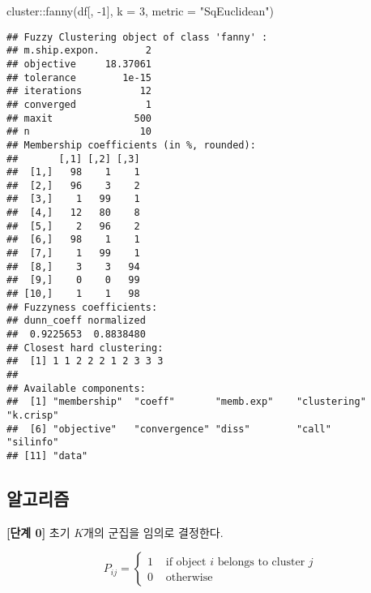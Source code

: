 \documentclass[
]{book}
\newenvironment{Shaded}{\begin{snugshade}}{\end{snugshade}}
\newcommand{\AttributeTok}[1]{\textcolor[rgb]{0.77,0.63,0.00}{#1}}
\newcommand{\DecValTok}[1]{\textcolor[rgb]{0.00,0.00,0.81}{#1}}
\newcommand{\FunctionTok}[1]{\textcolor[rgb]{0.00,0.00,0.00}{#1}}
\newcommand{\NormalTok}[1]{#1}
\newcommand{\SpecialCharTok}[1]{\textcolor[rgb]{0.00,0.00,0.00}{#1}}
\newcommand{\StringTok}[1]{\textcolor[rgb]{0.31,0.60,0.02}{#1}}
\begin{document}
\begin{Shaded}
\begin{Highlighting}[]
\NormalTok{cluster}\SpecialCharTok{::}\FunctionTok{fanny}\NormalTok{(df[, }\SpecialCharTok{{-}}\DecValTok{1}\NormalTok{], }\AttributeTok{k =} \DecValTok{3}\NormalTok{, }\AttributeTok{metric =} \StringTok{"SqEuclidean"}\NormalTok{)}
\end{Highlighting}
\end{Shaded}

\begin{verbatim}
## Fuzzy Clustering object of class 'fanny' :                      
## m.ship.expon.        2
## objective     18.37061
## tolerance        1e-15
## iterations          12
## converged            1
## maxit              500
## n                   10
## Membership coefficients (in %, rounded):
##       [,1] [,2] [,3]
##  [1,]   98    1    1
##  [2,]   96    3    2
##  [3,]    1   99    1
##  [4,]   12   80    8
##  [5,]    2   96    2
##  [6,]   98    1    1
##  [7,]    1   99    1
##  [8,]    3    3   94
##  [9,]    0    0   99
## [10,]    1    1   98
## Fuzzyness coefficients:
## dunn_coeff normalized 
##  0.9225653  0.8838480 
## Closest hard clustering:
##  [1] 1 1 2 2 2 1 2 3 3 3
## 
## Available components:
##  [1] "membership"  "coeff"       "memb.exp"    "clustering"  "k.crisp"    
##  [6] "objective"   "convergence" "diss"        "call"        "silinfo"    
## [11] "data"
\end{verbatim}

\hypertarget{fuzzy-kmeans-algorithm}{%
\subsection{알고리즘}\label{fuzzy-kmeans-algorithm}}

\textbf{{[}단계 0{]}} 초기 \(K\)개의 군집을 임의로 결정한다.

\begin{equation*}
P_{ij} = \begin{cases}
1 & \text{ if object $i$ belongs to cluster $j$}\\
0 & \text{ otherwise}
\end{cases}
\end{equation*}
\end{document}
